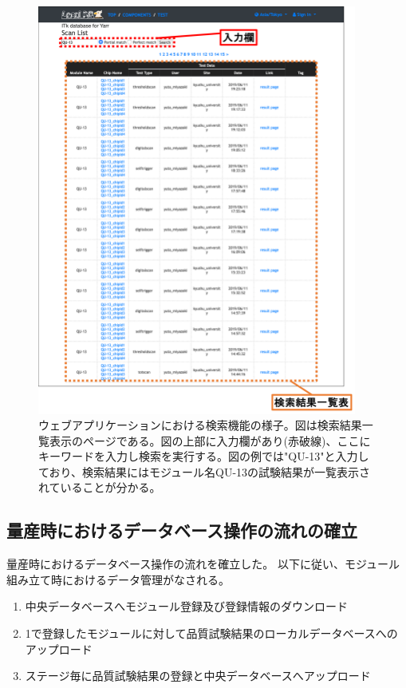 \begin{figure}[bpt]\centering
\includegraphics[width=10.5cm]{./webapp_search_function.png}
\caption[ウェブアプリケーションにおける検索機能の様子]{ウェブアプリケーションにおける検索機能の様子。図は検索結果一覧表示のページである。図の上部に入力欄があり(赤破線)、ここにキーワードを入力し検索を実行する。図の例では"QU-13"と入力しており、検索結果にはモジュール名QU-13の試験結果が一覧表示されていることが分かる。}
\label{webapp_search_function}
\end{figure}


\clearpage
\subsection{量産時におけるデータベース操作の流れの確立}
量産時におけるデータベース操作の流れを確立した。
以下に従い、モジュール組み立て時におけるデータ管理がなされる。
\begin{enumerate}
  \item 中央データベースへモジュール登録及び登録情報のダウンロード
  \item 1で登録したモジュールに対して品質試験結果のローカルデータベースへのアップロード
  \item ステージ毎に品質試験結果の登録と中央データベースへアップロード
\end{enumerate}

